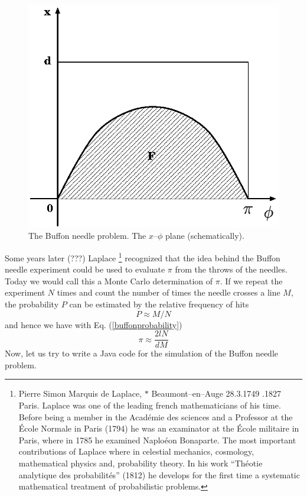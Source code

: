 \begin{figure}
\label{fig:buffonplane}
\includegraphics[width=.8\textwidth]{Figures/buffonplane.eps}
\caption{The Buffon needle problem. The $x$--$\phi$ plane (schematically).}
\end{figure}

Some years later (???) Laplace 
\footnote{Pierre Simon Marquis de Laplace, $\ast$ Beaumont--en--Auge
  28.3.1749 .1827 Paris. Laplace was one of the leading french
  mathematicians of his time. Before being a member in the Acad\'emie
  des sciences and a Professor at the \'Ecole Normale in Paris (1794)
he was an examinator at the \'Ecole militaire in Paris, where in 1785
he examined Naplo\'eon Bonaparte. The most important contributions of
Laplace where in celestial mechanics, cosmology, mathematical physics
and, probability theory. In his work ``Th\'eotie analytique des
probabilit\'es'' (1812) he develops  for the first time a systematic
mathematical treatment of probabilistic problems.} recognized that
the idea behind the Buffon needle experiment could be used to evaluate
$\pi$ from the throws of the needles. Today we would call this a
Monte Carlo determination of $\pi$. If we repeat the experiment $N$
times and count the number of times the needle crosses a line $M$, the
probability $P$ can be estimated by the relative frequency of hits
\begin{equation}
\label{buffonestimateP}
P \approx M/N
\end{equation}
and hence we have with Eq. (\ref{buffonprobability})
\begin{equation}
\pi \approx \frac{2lN}{dM}
\end{equation}
Now, let us try to write a Java code for the simulation of the Buffon
needle problem.


